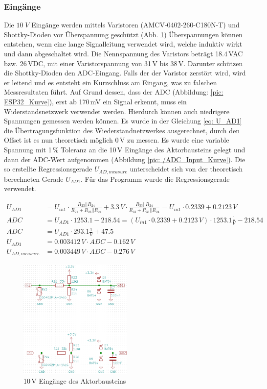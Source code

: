 \subsubsection{Eingänge}
Die $10\;V$ Eingänge werden mittels Varistoren (AMCV-0402-260-C180N-T) und Shottky-Dioden vor Überspannung geschützt (Abb. \ref{pic: Input_aktor}) Überspannungen können entstehen, wenn eine lange Signalleitung verwendet wird, welche induktiv wirkt und dann abgeschaltet wird. Die Nennspannung des Varistors beträgt 18.4\,VAC bzw. 26\,VDC, mit einer Varistorspannung von 31\,V bis 38\,V. Darunter schützen die Shottky-Dioden den ADC-Eingang. Falls der der Varistor zerstört wird, wird er leitend und es entsteht ein Kurzschluss am Eingang, was zu falschen Messresultaten führt. Auf Grund dessen, dass der ADC (Abbildung: \ref{pic: ESP32_Kurve}), erst ab 170\,mV ein Signal erkennt, muss ein Widerstandsnetzwerk verwendet werden. Hierdurch können auch niedrigere Spannungen gemessen werden können. Es wurde in der Gleichung \ref{eq: U_AD1} die Übertragungsfunktion des Wiederstandnetzwerkes ausgerechnet, durch den Offset ist es nun theoretisch möglich 0\,V zu messen. Es wurde eine variable Spannung mit 1\,\% Toleranz an die 10\,V Eingänge des Aktorbausteins gelegt und dann der ADC-Wert aufgenommen (Abbildung \ref{pic: /ADC_Input_Kurve}). Die so erstellte Regressionsgerade $U_{AD,measure}$ unterscheidet sich von der theoretisch berechneten Gerade $U_{AD1}$. Für das Programm wurde die Regressionsgerade verwendet.

\begin{align}
U_{AD1} &= U_{in1} \cdot \frac{R_{23}||R_{24}}{R_{21}+R_{23}||R_{24}} + 3.3\,V \cdot \frac{R_{33}||R_{24}}{R_{23}+R_{33}||R_{24}} =  U_{in1} \cdot 0.2339 + 0.2123\,V \label{eq: U_AD1}\\
ADC &= U_{AD1} \cdot 1253.1 - 218.54 = (U_{in1} \cdot 0.2339 + 0.2123\,V) \cdot 1253.1 \frac{1}{V} - 218.54\\
ADC &= U_{AD1} \cdot 293.1 \frac{1}{V} + 47.5\\
U_{AD1} &= 0.003412\,V \cdot ADC - 0.162\,V\\
U_{AD,measure} &= 0.003449\,V \cdot ADC - 0.276\,V
\end{align}

\begin{figure}[h!]
	\centering
	\includegraphics[width=0.5\textwidth]{graphics/shematics_aktor_input.png}
	\caption{10\,V Eingänge des Aktorbausteins}
	\label{pic: Input_aktor}
\end{figure}

